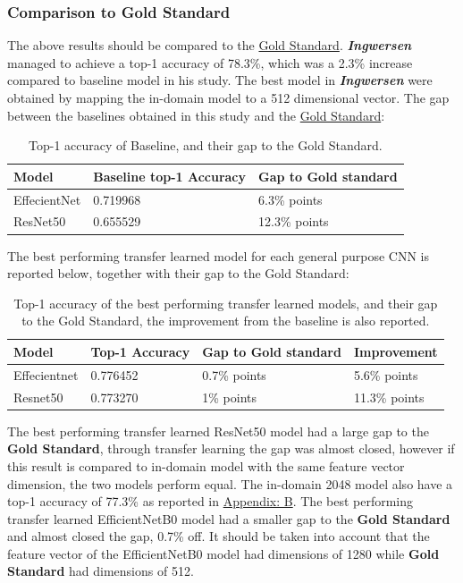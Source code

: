 \subsubsection{Comparison to Gold Standard}
The above results should be compared to the \hyperref[goldstandard]{Gold Standard}. \textbf{\textit{Ingwersen}} managed to achieve a top-1 accuracy of 78.3\%, which was a 2.3\% increase compared to baseline model in his study. The best model in \textbf{\textit{Ingwersen}} were obtained by mapping the in-domain model to a 512 dimensional vector. The gap between the baselines obtained in this study and the \hyperref[goldstandard]{Gold Standard}:
\begin{table}[H]
\centering
\begin{tabular}{lll}
Model     & Baseline top-1 Accuracy                      & Gap to Gold standard     \\ \hline
\multicolumn{1}{|l|}{EffecientNet} & \multicolumn{1}{l|}{0.719968} & \multicolumn{1}{l|}{6.3\% points} \\ \hline
\multicolumn{1}{|l|}{ResNet50}     & \multicolumn{1}{l|}{0.655529} & \multicolumn{1}{l|}{12.3\% points}       \\ \hline
\end{tabular}
\caption{Top-1 accuracy of Baseline, and their gap to the Gold Standard.}
\end{table}
The best performing transfer learned model for each general purpose CNN is reported below, together with their gap to the Gold Standard:
\begin{table}[H]
\centering
\begin{tabular}{llll}
Model     & Top-1 Accuracy      & Gap to Gold standard & Improvement     \\ \hline
\multicolumn{1}{|l|}{Effecientnet} & \multicolumn{1}{l|}{0.776452} & \multicolumn{1}{l|}{0.7\% points} & \multicolumn{1}{l|}{5.6\% points} \\ \hline
\multicolumn{1}{|l|}{Resnet50}     & \multicolumn{1}{l|}{0.773270} & \multicolumn{1}{l|}{1\% points}  &   \multicolumn{1}{l|}{11.3\% points}  \\ \hline
\end{tabular}
\caption{Top-1 accuracy of the best performing transfer learned models, and their gap to the Gold Standard, the improvement from the baseline is also reported. }
\end{table}
The best performing transfer learned ResNet50 model had a large gap to the \textbf{Gold Standard}, through transfer learning the gap was almost closed, however if this result is compared to in-domain model with the same feature vector dimension, the two models perform equal. The in-domain 2048 model also have a top-1 accuracy of 77.3\% as reported in \hyperref[appendix: B]{Appendix: B}. The best performing transfer learned EfficientNetB0 model had a smaller gap to the \textbf{Gold Standard} and almost closed the gap, 0.7\% off. It should be taken into account that the feature vector of the EfficientNetB0 model had dimensions of 1280 while \textbf{Gold Standard} had dimensions of 512.
